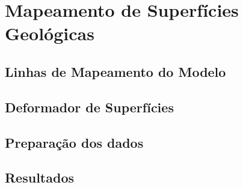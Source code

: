 
\chapter{Mapeamento de Superfícies Geológicas}

\section{Linhas de Mapeamento do Modelo}

\section{Deformador de Superfícies}

\section{Preparação dos dados}

\section{Resultados}

